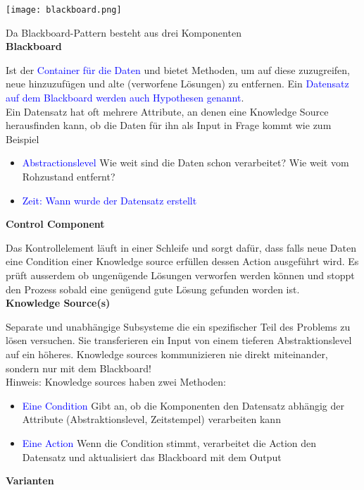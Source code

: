 \texttt{[image: blackboard.png]}

Da Blackboard-Pattern besteht aus drei Komponenten \\

\textbf{Blackboard}

Ist der \textcolor{blue}{Container für die Daten} und bietet Methoden, um auf diese zuzugreifen, neue hinzuzufügen und alte (verworfene Lösungen) zu entfernen. Ein \textcolor{blue}{Datensatz auf dem Blackboard werden auch Hypothesen genannt}. \\

Ein Datensatz hat oft mehrere Attribute, an denen eine Knowledge Source herausfinden kann, ob die Daten für ihn als Input in Frage kommt wie zum Beispiel

\begin{itemize}
    \item \textcolor{blue}{Abstractionslevel} Wie weit sind die Daten schon verarbeitet? Wie weit vom Rohzustand entfernt?
    \item \textcolor{blue}{Zeit: Wann wurde der Datensatz erstellt}
\end{itemize}
\vspace{10pt}
\textbf{Control Component}

Das Kontrollelement läuft in einer Schleife und sorgt dafür, dass falls neue Daten eine Condition einer Knowledge source erfüllen dessen Action ausgeführt wird. Es prüft ausserdem ob ungenügende Lösungen verworfen werden können und stoppt den Prozess sobald eine genügend gute Lösung gefunden worden ist. \\

\textbf{Knowledge Source(s)}

Separate und unabhängige Subsysteme die ein spezifischer Teil des Problems zu lösen versuchen. Sie transferieren ein Input von einem tieferen Abstraktionslevel auf ein höheres. Knowledge sources kommunizieren nie direkt miteinander, sondern nur mit dem Blackboard! \\

Hinweis: Knowledge sources haben zwei Methoden:

\begin{itemize}
    \item \textcolor{blue}{Eine Condition} Gibt an, ob die Komponenten den Datensatz abhängig der Attribute (Abstraktionslevel, Zeitstempel) verarbeiten kann
    \item \textcolor{blue}{Eine Action} Wenn die Condition stimmt, verarbeitet die Action den Datensatz und aktualisiert das Blackboard mit dem Output
\end{itemize}
\vspace{10pt}
\textbf{Varianten}

